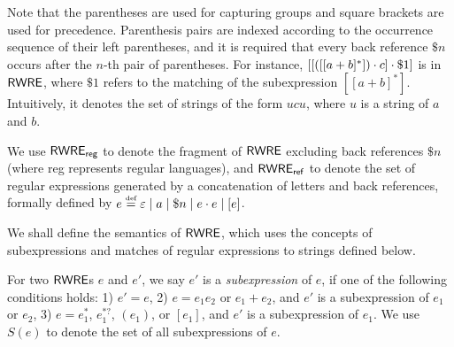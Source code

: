 Note that the parentheses are used for capturing groups and square brackets  are used for precedence. 
%
Parenthesis pairs are indexed according to the occurrence sequence of their left parentheses, and it is required that every back reference $\$ n$ occurs  %
after the $n$-th pair of parentheses. For instance, $[[([[a+b]^*]) \cdot c] \cdot \$1]$ is in ${\sf RWRE}$, where $\$1$ refers to the matching of the subexpression $[[a+b]^*]$. Intuitively, it denotes the set of strings of the form $u c u$, where $u$ is a string of $a$ and $b$. 
  
We use ${\sf RWRE_{reg}}$ to denote the fragment of ${\sf RWRE}$ excluding  back references $\$ n$ (where {\sf reg} represents regular languages), and ${\sf RWRE_{ref}}$ to denote the set of regular expressions generated by a concatenation of letters and back references, formally %
defined by $e \eqdef \varepsilon \mid a \mid \$n \mid e \concat e \mid [e]$.  
  
  

We shall define the semantics of ${\sf RWRE}$, which uses the concepts of subexpressions and matches of regular expressions to strings defined below.
  
   For two ${\sf RWRE}$s $e$ and $e'$, we say $e'$ is a \emph{subexpression} of $e$,
  	if one of the following conditions holds: 1) $e'=e$, 2) $e = e_1 e_2$ or $e_1 + e_2$, and $e'$ is a subexpression of $e_1$ or $e_2$, 3) $e = e_1^{\ast}$, $e_1^{\ast?}$, $(e_1)$, or $[e_1]$, and $e'$ is a subexpression of $e_1$. We use $S (e)$ to denote the set of all subexpressions of $e$. %
  
